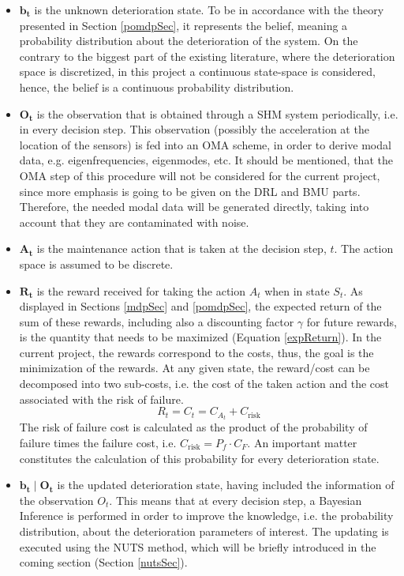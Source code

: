 \begin{itemize}
    \item $\boldsymbol{b_t}$ is the unknown deterioration state. To be in accordance with the theory presented in Section \ref{pomdpSec}, it represents the belief, meaning a probability distribution about the deterioration of the system. On the contrary to the biggest part of the existing literature, where the deterioration space is discretized, in this project a continuous state-space is considered, hence, the belief is a continuous probability distribution.
    \item $\boldsymbol{O_t}$ is the observation that is obtained through a \gls{SHM} system periodically, i.e. in every decision step. This observation (possibly the acceleration at the location of the sensors) is fed into an \gls{OMA} scheme, in order to derive modal data, e.g. eigenfrequencies, eigenmodes, etc. It should be mentioned, that the \gls{OMA} step of this procedure will not be considered for the current project, since more emphasis is going to be given on the \gls{DRL} and \gls{BMU} parts. Therefore, the needed modal data will be generated directly, taking into account that they are contaminated with noise. 
    \item $\boldsymbol{A_t}$ is the maintenance action that is taken at the decision step, $t$. The action space is assumed to be discrete.
    \item $\boldsymbol{R_t}$ is the reward received for taking the action $A_t$ when in state $S_t$. As displayed in Sections \ref{mdpSec} and \ref{pomdpSec}, the expected return of the sum of these rewards, including also a discounting factor $\gamma$ for future rewards, is the quantity that needs to be maximized (Equation \ref{expReturn}). In the current project, the rewards correspond to the costs, thus, the goal is the minimization of the rewards. At any given state, the reward/cost can be decomposed into two sub-costs, i.e. the cost of the taken action and the cost associated with the risk of failure.\\
    \begin{equation}
        R_t = C_t = C_{A_t} + C_{\text{risk}} \label{rewardEq}
    \end{equation}
    The risk of failure cost is calculated as the product of the probability of failure times the failure cost, i.e. $C_{\text{risk}} = P_f \cdot C_F$. An important matter constitutes the calculation of this probability for every deterioration state. 
    \item $\boldsymbol{b_t \mid O_t}$ is the updated deterioration state, having included the information of the observation $O_t$. This means that at every decision step, a Bayesian Inference is performed in order to improve the knowledge, i.e. the probability distribution, about the deterioration parameters of interest. The updating is executed using the \gls{NUTS} method, which will be briefly introduced in the coming section (Section \ref{nutsSec}).
\end{itemize}

